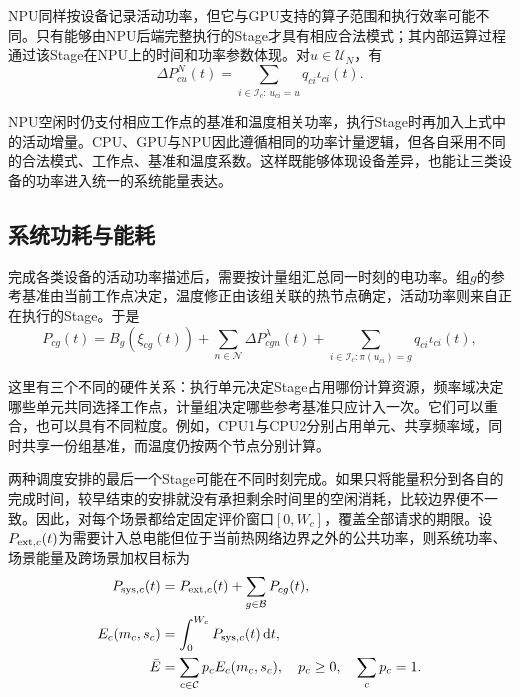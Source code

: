 NPU同样按设备记录活动功率，但它与GPU支持的算子范围和执行效率可能不同。只有能够由NPU后端完整执行的Stage才具有相应合法模式；其内部运算过程通过该Stage在NPU上的时间和功率参数体现。对$u\in\mathcal U_N$，有
\begin{equation}
\Delta P^{N}_{cu}(t)=
\sum_{i\in\mathcal I_c:\,u_{ci}=u}q_{ci}\iota_{ci}(t).
\label{eq:npu-active-power}
\end{equation}

NPU空闲时仍支付相应工作点的基准和温度相关功率，执行Stage时再加入上式中的活动增量。CPU、GPU与NPU因此遵循相同的功率计量逻辑，但各自采用不同的合法模式、工作点、基准和温度系数。这样既能够体现设备差异，也能让三类设备的功率进入统一的系统能量表达。

\subsection{系统功耗与能耗}

完成各类设备的活动功率描述后，需要按计量组汇总同一时刻的电功率。组$g$的参考基准由当前工作点决定，温度修正由该组关联的热节点确定，活动功率则来自正在执行的Stage。于是
\begin{equation}
P_{cg}(t)=B_g(\xi_{cg}(t))
+\sum_{n\in\mathcal N}\Delta P^\lambda_{cgn}(t)
+\sum_{i\in\mathcal I_c:\pi(u_{ci})=g}q_{ci}\iota_{ci}(t),
\label{eq:group-electric-power}
\end{equation}

这里有三个不同的硬件关系：执行单元决定Stage占用哪份计算资源，频率域决定哪些单元共同选择工作点，计量组决定哪些参考基准只应计入一次。它们可以重合，也可以具有不同粒度。例如，CPU1与CPU2分别占用单元、共享频率域，同时共享一份组基准，而温度仍按两个节点分别计算。

两种调度安排的最后一个Stage可能在不同时刻完成。如果只将能量积分到各自的完成时间，较早结束的安排就没有承担剩余时间里的空闲消耗，比较边界便不一致。因此，对每个场景都给定固定评价窗口$[0,W_c]$，覆盖全部请求的期限。设$P_{{\rm ext},c}(t)$为需要计入总电能但位于当前热网络边界之外的公共功率，则系统功率、场景能量及跨场景加权目标为
\begin{equation}
\begin{aligned}
P_{{\rm sys},c}(t)&=P_{{\rm ext},c}(t)+\sum_{g\in\mathcal B}P_{cg}(t),\\
E_c(m_c,s_c)&=\int_0^{W_c}P_{{\rm sys},c}(t)\,\mathrm dt,\\
\bar E&=\sum_{c\in\mathcal C}p_cE_c(m_c,s_c),\quad
p_c\ge0,\quad\sum_cp_c=1.
\end{aligned}
\label{eq:full-energy}
\end{equation}


